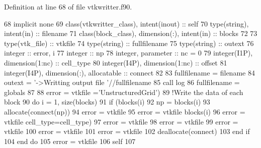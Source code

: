 Definition at line 68 of file vtkwritter.\+f90.


\begin{DoxyCode}
68     \textcolor{keywordtype}{implicit none}
69     \textcolor{keywordtype}{class}(vtkwritter\_class), \textcolor{keywordtype}{intent(inout)} :: self
70     \textcolor{keywordtype}{type}(string), \textcolor{keywordtype}{intent(in)} :: filename
71     \textcolor{keywordtype}{class}(block\_class), \textcolor{keywordtype}{dimension(:)}, \textcolor{keywordtype}{intent(in)} :: blocks
72 
73     \textcolor{keywordtype}{type}(vtk\_file) :: vtkfile
74     \textcolor{keywordtype}{type}(string) :: fullfilename
75     \textcolor{keywordtype}{type}(string) :: outext
76     \textcolor{keywordtype}{integer} :: error, i
77     \textcolor{keywordtype}{integer} :: np
78     \textcolor{keywordtype}{integer}, \textcolor{keywordtype}{parameter} :: nc = 0
79     \textcolor{keywordtype}{integer(I1P)}, \textcolor{keywordtype}{dimension(1:nc)} :: cell\_type
80     \textcolor{keywordtype}{integer(I4P)}, \textcolor{keywordtype}{dimension(1:nc)} :: offset
81     \textcolor{keywordtype}{integer(I4P)}, \textcolor{keywordtype}{dimension(:)}, \textcolor{keywordtype}{allocatable} :: connect
82 
83     fullfilename = filename%
84     outext = \textcolor{stringliteral}{'->Writting output file '}//fullfilename
85     \textcolor{keyword}{call }log%
86     fullfilename = globals%
87 
88     error = vtkfile%
      =\textcolor{stringliteral}{'UnstructuredGrid'})
89     \textcolor{comment}{!Write the data of each block}
90     \textcolor{keywordflow}{do} i = 1, \textcolor{keyword}{size}(blocks)
91         \textcolor{keywordflow}{if} (blocks(i)%
92             np = blocks(i)%
93             \textcolor{keyword}{allocate}(connect(np))
94             error = vtkfile%
95             error = vtkfile%
      blocks(i)%
96             error = vtkfile%
      cell\_type=cell\_type)
97             error = vtkfile%
98             error = vtkfile%
99             error = vtkfile%
100             error = vtkfile%
101             error = vtkfile%
102             \textcolor{keyword}{deallocate}(connect)
103 \textcolor{keywordflow}{        end if}
104 \textcolor{keywordflow}{    end do}
105     error = vtkfile%
106     self%
107 
\end{DoxyCode}


